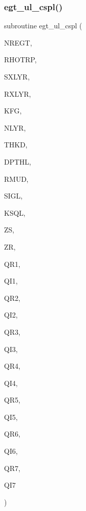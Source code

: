 \subsubsection{\texorpdfstring{egt\+\_\+ul\+\_\+cspl()}{egt\_ul\_cspl()}}
{\footnotesize\ttfamily subroutine egt\+\_\+ul\+\_\+cspl (\begin{DoxyParamCaption}\item[{integer}]{N\+R\+E\+GT,  }\item[{real, dimension(nregt)}]{R\+H\+O\+T\+RP,  }\item[{integer}]{S\+X\+L\+YR,  }\item[{integer}]{R\+X\+L\+YR,  }\item[{integer}]{K\+FG,  }\item[{integer}]{N\+L\+YR,  }\item[{real(kind=ql), dimension (nlyr)}]{T\+H\+KD,  }\item[{real(kind=ql), dimension (nlyr)}]{D\+P\+T\+HL,  }\item[{real (kind=ql), dimension(0\+:nlyr)}]{R\+M\+UD,  }\item[{complex(kind=ql), dimension(nlyr)}]{S\+I\+GL,  }\item[{complex(kind=ql), dimension(nlyr)}]{K\+S\+QL,  }\item[{real (kind=ql)}]{ZS,  }\item[{real (kind=ql)}]{ZR,  }\item[{real, dimension (4,nregt)}]{Q\+R1,  }\item[{real, dimension (4,nregt)}]{Q\+I1,  }\item[{real, dimension (4,nregt)}]{Q\+R2,  }\item[{real, dimension (4,nregt)}]{Q\+I2,  }\item[{real, dimension (4,nregt)}]{Q\+R3,  }\item[{real, dimension (4,nregt)}]{Q\+I3,  }\item[{real, dimension (4,nregt)}]{Q\+R4,  }\item[{real, dimension (4,nregt)}]{Q\+I4,  }\item[{real, dimension (4,nregt)}]{Q\+R5,  }\item[{real, dimension (4,nregt)}]{Q\+I5,  }\item[{real, dimension (4,nregt)}]{Q\+R6,  }\item[{real, dimension (4,nregt)}]{Q\+I6,  }\item[{real, dimension (4,nregt)}]{Q\+R7,  }\item[{real, dimension (4,nregt)}]{Q\+I7 }\end{DoxyParamCaption})}

